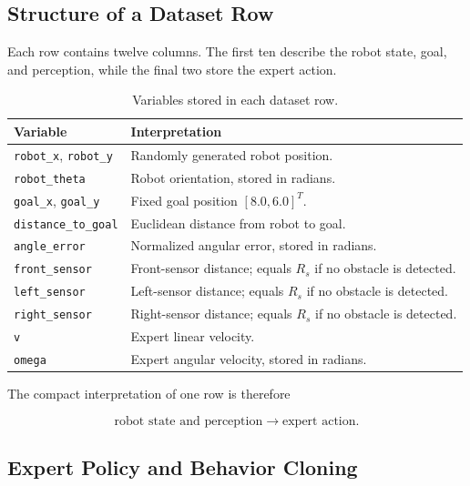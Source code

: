 \documentclass[10pt,twocolumn,a4paper]{article}
\begin{document}
\subsection{Structure of a Dataset Row}

Each row contains twelve columns. The first ten describe the robot state,
goal, and perception, while the final two store the expert action.

\begin{table}[H]
\centering
\small
\setlength{\tabcolsep}{3pt}
\caption{Variables stored in each dataset row.}
\label{tab:dataset_columns}
\begin{tabular}{>{\raggedright\arraybackslash}p{}
                >{\raggedright\arraybackslash}p{}}
\toprule
\textbf{Variable} & \textbf{Interpretation} \\
\midrule
\texttt{robot\_x}, \texttt{robot\_y}
& Randomly generated robot position. \\
\texttt{robot\_theta}
& Robot orientation, stored in radians. \\
\texttt{goal\_x}, \texttt{goal\_y}
& Fixed goal position $[8.0,6.0]^T$. \\
\texttt{distance\_to\_goal}
& Euclidean distance from robot to goal. \\
\texttt{angle\_error}
& Normalized angular error, stored in radians. \\
\texttt{front\_sensor}
& Front-sensor distance; equals $R_s$ if no obstacle is detected. \\
\texttt{left\_sensor}
& Left-sensor distance; equals $R_s$ if no obstacle is detected. \\
\texttt{right\_sensor}
& Right-sensor distance; equals $R_s$ if no obstacle is detected. \\
\texttt{v}
& Expert linear velocity. \\
\texttt{omega}
& Expert angular velocity, stored in radians. \\
\bottomrule
\end{tabular}
\end{table}

The compact interpretation of one row is therefore

\[
    \text{robot state and perception}
    \longrightarrow
    \text{expert action}.
\]

\subsection{Expert Policy and Behavior Cloning}
\end{document}
